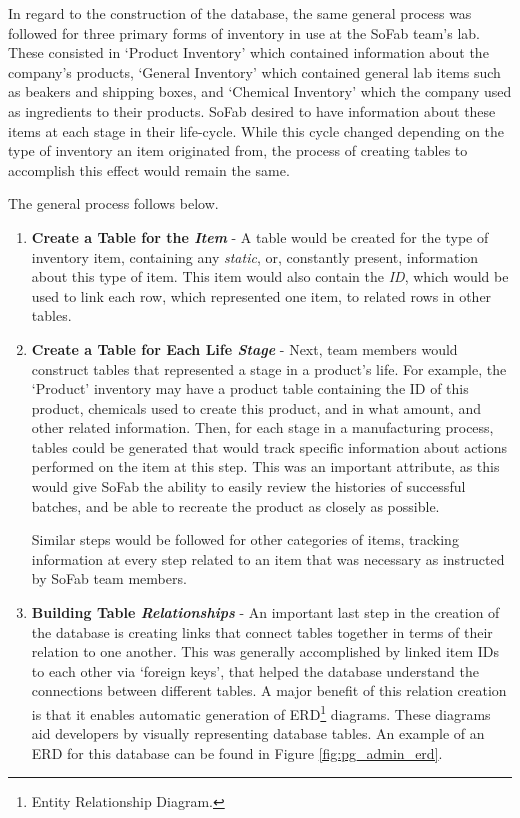 \documentclass{article}
\begin{document}
In regard to the construction of the database, the same general process was followed for three primary forms of inventory in use 
at the SoFab team's lab. These consisted in `Product Inventory' which contained information about the company's products, 
`General Inventory' which contained general lab items such as beakers and shipping boxes, and `Chemical Inventory' which the 
company used as ingredients to their products. SoFab desired to have information about these items at each stage in their life-cycle. 
While this cycle changed depending on the type of inventory an item originated from, the process of creating tables to accomplish this
effect would remain the same. 

The general process follows below.
\begin{enumerate}
    \item \textbf{Create a Table for the \textit{Item}} - A table would be created for the type of inventory item, containing any 
        \textit{static}, or, constantly present, information about this type of item. This item would also contain the \textit{ID}, 
        which would be used to link each row, which represented one item, to related rows in other tables. 
    \item \textbf{Create a Table for Each Life \textit{Stage}} - Next, team members would construct tables that represented a stage in a 
        product's life. For example, the `Product' inventory may have a product table containing the ID of this product, chemicals used to 
        create this product, and in what amount, and other related information. Then, for each stage in a manufacturing process, 
        tables could be generated that would track specific information about actions performed on the item at this step. This was an
        important attribute, as this would give SoFab the ability to easily review the histories of successful batches, and be able to 
        recreate the product as closely as possible. 

        Similar steps would be followed for other categories of items, tracking information at every step related to an item that was 
        necessary as instructed by SoFab team members. 
    \item \textbf{Building Table \textit{Relationships}} - An important last step in the creation of the database is creating links 
        that connect tables together in terms of their relation to one another. This was generally accomplished by linked item IDs to 
        each other via `foreign keys', that helped the database understand the connections between different tables. A major benefit of 
        this relation creation is that it enables automatic generation of ERD\footnote{Entity Relationship Diagram.} diagrams. These 
        diagrams aid developers by visually representing database tables. An example of an ERD for this database can be found in 
        Figure \ref{fig:pg_admin_erd}.
\end{enumerate}
\end{document}
